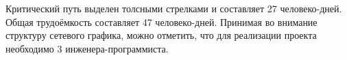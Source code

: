 \newpage

Критический путь выделен толсными стрелками
и составляет 27 человеко-дней. Общая трудоёмкость составляет 47 человеко-дней.
Принимая во внимание структуру сетевого графика, можно отметить,
что для реализации проекта необходимо 3 инженера-программиста.

